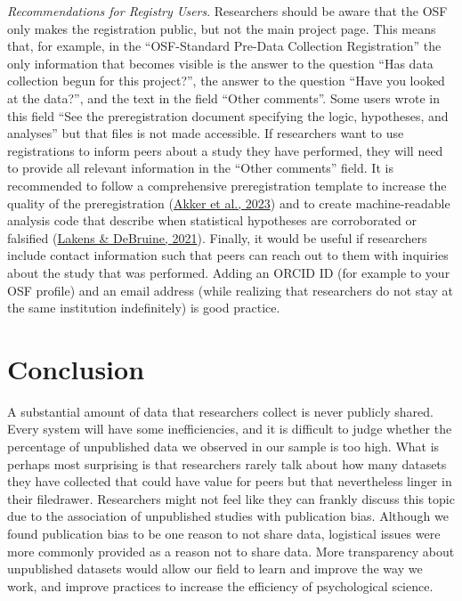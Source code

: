 \documentclass[
  ,jou, a4paper,floatsintext]{apa6}
\begin{document}
\emph{Recommendations for Registry Users}. Researchers should be aware that the OSF only makes the registration public, but not the main project page. This means that, for example, in the ``OSF-Standard Pre-Data Collection Registration'' the only information that becomes visible is the answer to the question ``Has data collection begun for this project?'', the answer to the question ``Have you looked at the data?'', and the text in the field ``Other comments''. Some users wrote in this field ``See the preregistration document specifying the logic, hypotheses, and analyses'' but that files is not made accessible. If researchers want to use registrations to inform peers about a study they have performed, they will need to provide all relevant information in the ``Other comments'' field. It is recommended to follow a comprehensive preregistration template to increase the quality of the preregistration (\protect\hyperlink{ref-akker_effectiveness_2023}{Akker et al., 2023}) and to create machine-readable analysis code that describe when statistical hypotheses are corroborated or falsified (\protect\hyperlink{ref-lakens_improving_2021}{Lakens \& DeBruine, 2021}). Finally, it would be useful if researchers include contact information such that peers can reach out to them with inquiries about the study that was performed. Adding an ORCID ID (for example to your OSF profile) and an email address (while realizing that researchers do not stay at the same institution indefinitely) is good practice.

\hypertarget{conclusion}{%
\section{Conclusion}\label{conclusion}}

A substantial amount of data that researchers collect is never publicly shared. Every system will have some inefficiencies, and it is difficult to judge whether the percentage of unpublished data we observed in our sample is too high. What is perhaps most surprising is that researchers rarely talk about how many datasets they have collected that could have value for peers but that nevertheless linger in their filedrawer. Researchers might not feel like they can frankly discuss this topic due to the association of unpublished studies with publication bias. Although we found publication bias to be one reason to not share data, logistical issues were more commonly provided as a reason not to share data. More transparency about unpublished datasets would allow our field to learn and improve the way we work, and improve practices to increase the efficiency of psychological science.
\end{document}
